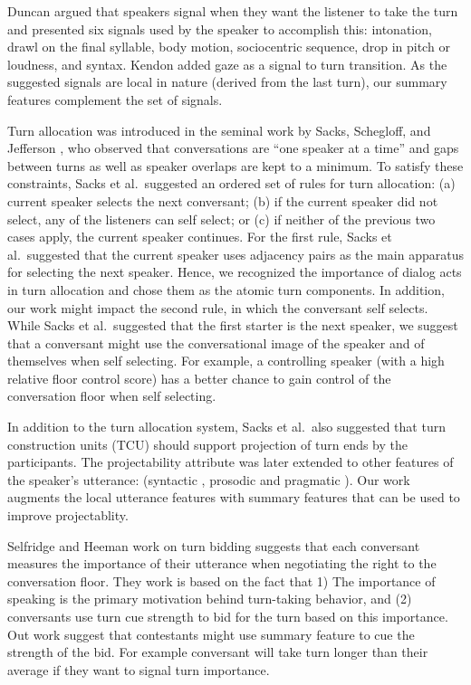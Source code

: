 Duncan \cite{duncan1972some} argued that speakers signal when they want the listener to take the turn and presented six signals used by the speaker to accomplish this: intonation, drawl on the final syllable, body motion, sociocentric sequence, drop in pitch or loudness, and syntax. Kendon \cite{kendon1967some} added gaze as a signal to turn transition. As the suggested signals are local in nature (derived from the last turn), our summary features complement the set of signals.


Turn allocation was introduced in the seminal work by Sacks, Schegloff, and Jefferson \cite{sacks1974simplest}, who observed that conversations are ``one speaker at a time'' and gaps between turns as well as speaker overlaps are kept to a minimum. To satisfy these constraints, Sacks et al.~suggested an ordered set of rules for turn allocation:
%
(a) current speaker selects the next conversant; (b) if the current speaker did not select, any of the listeners can self select; or (c) if neither of the previous two cases apply, the current speaker continues.
%
For the first rule, Sacks et al.~suggested that the current speaker uses adjacency pairs as the main apparatus for selecting the next speaker. Hence, we recognized the importance of dialog acts in turn allocation and chose them as the atomic turn components. In addition, our work might impact the second rule, in which the conversant self selects. While Sacks et al.~suggested that the first starter is the next speaker, we suggest that a conversant might use the conversational image of the speaker and of themselves when self selecting. For example, a controlling speaker (with a high relative floor control score) has a better chance to gain control of the conversation floor when self selecting.  

In addition to the turn allocation system, Sacks et al.~also suggested that turn construction units (TCU) should support projection of turn ends by the participants. The projectability attribute was later extended to other features of the speaker's utterance: (syntactic \cite{sacks1974simplest}, prosodic \cite{ford1996interactional} and pragmatic \cite{ford1996interactional,ford2001intersection}). Our work augments the local utterance features with summary features that can be used to improve projectablity.

Selfridge and Heeman \cite{SelfridgeHeeman10:acl} work on turn bidding suggests that each conversant measures the importance of their utterance when negotiating the right to the conversation floor. They work
is based on the fact that 1) The importance of speaking is the primary motivation behind turn-taking behavior, and (2) conversants use turn cue strength to bid for the turn based on this importance. Out work suggest that contestants might use summary feature to cue the strength of the bid. For example conversant will take turn longer than their average if they want to signal turn importance. 



